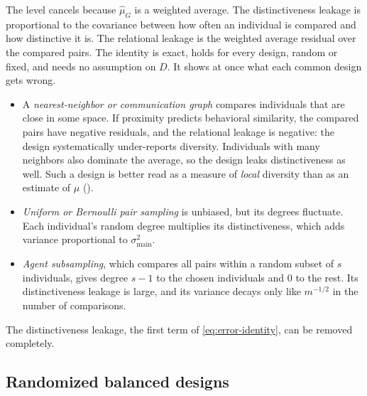 \documentclass[twoside,11pt]{article}
\DeclarePairedDelimiter{\abs}{\lvert}{\rvert}
\DeclarePairedDelimiter{\norm}{\lVert}{\rVert}
\newcommand{\SND}{\mu}
\newcommand{\SNDG}{\widehat{\mu}_{G}}
\newcommand{\sigmamain}{\sigma^2_{\mathrm{main}}}
\newcommand{\one}{\mathbf{1}}
\begin{document}
The level cancels because $\SNDG$ is a weighted average. The distinctiveness
leakage is proportional to the covariance between how often an individual is compared and how
distinctive it is. The relational leakage is the weighted average residual
over the compared pairs. The identity is exact, holds for every design,
random or fixed, and needs no assumption on $D$. It shows at once what each
common design gets wrong.
\begin{itemize}
  \item A \emph{nearest-neighbor or communication graph} compares
  individuals that are close in some space. If proximity predicts
  behavioral similarity, the compared pairs have negative residuals, and
  the relational leakage is negative: the design systematically
  under-reports diversity. Individuals with many neighbors also dominate the
  average, so the design leaks distinctiveness as well. Such a design is
  better read as a measure of \emph{local} diversity than as an estimate of
  $\mu$ ().
  \item \emph{Uniform or Bernoulli pair sampling} is unbiased, but its
  degrees fluctuate. Each individual's random degree multiplies its
  distinctiveness, which adds variance proportional to $\sigmamain$.
  \item \emph{Agent subsampling}, which compares all pairs within a random
  subset of $s$ individuals, gives degree $s-1$ to the chosen individuals
  and $0$ to the rest. Its distinctiveness leakage is large, and its
  variance decays only like $m^{-1/2}$ in the number of comparisons.
\end{itemize}
The distinctiveness leakage, the first term of \eqref{eq:error-identity},
can be removed completely.


\subsection{Randomized balanced designs}
\label{sec:balanced}
\end{document}
